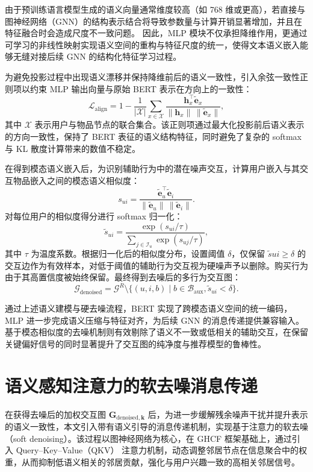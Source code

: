 由于预训练语言模型生成的语义向量通常维度较高（如 768 维或更高），若直接与图神经网络（GNN）的结构表示结合将导致参数量与计算开销显著增加，并且在特征融合时会造成尺度不一致问题。
因此，MLP 模块不仅承担降维作用，更通过可学习的非线性映射实现语义空间的重构与特征尺度的统一，使得文本语义嵌入能够无缝对接后续 GNN 的结构化特征学习过程。

为避免投影过程中出现语义漂移并保持降维前后的语义一致性，引入余弦一致性正则项以约束 MLP 输出向量与原始 BERT 表示在方向上的一致性：
\begin{equation} \mathcal{L}_{\text{align}} = 1 - \frac{1}{|\mathcal{X}|} \sum_{x \in \mathcal{X}} \frac{\mathbf{h}_x^\top \widetilde{\mathbf{e}}_x} {\|\mathbf{h}_x\| \, \|\widetilde{\mathbf{e}}_x\|}, \end{equation}
其中 $\mathcal{X}$ 表示用户与物品节点的联合集合。该正则项通过最大化投影前后语义表示的方向一致性，保持了 BERT 表征的语义结构特征，同时避免了复杂的 softmax 与 KL 散度计算带来的数值不稳定。

在得到模态语义嵌入后，为识别辅助行为中的潜在噪声交互，计算用户嵌入与其交互物品嵌入之间的模态语义相似度：
\begin{equation} s_{ui} = \frac{\widetilde{\mathbf{e}}_u^\top \widetilde{\mathbf{e}}_i} {\|\widetilde{\mathbf{e}}_u\| \, \|\widetilde{\mathbf{e}}_i\|}. \end{equation}
对每位用户的相似度得分进行 softmax 归一化：
\begin{equation} \tilde{s}_{ui} = \frac{\exp(s_{ui}/\tau)} {\sum_{j \in \mathcal{I}_u} \exp(s_{uj}/\tau)}, \end{equation}
其中 $\tau$ 为温度系数。根据归一化后的相似度分布，设置阈值 $\delta$，仅保留 $\tilde{s}{ui} \ge \delta$ 的交互边作为有效样本，对低于阈值的辅助行为交互视为硬噪声予以删除。购买行为由于其高置信度被始终保留。最终得到去噪后的多行为交互图：
\begin{equation} \mathcal{G}_{\text{denoised}} = \mathcal{G}^R \setminus \{(u,i,b) \mid b \in \mathcal{B}_{\text{aux}}, \tilde{s}_{ui} < \delta\}. \end{equation}

通过上述语义建模与硬去噪流程，BERT 实现了跨模态语义空间的统一编码，MLP 进一步完成语义压缩与特征对齐，为后续 GNN 的消息传递提供兼容输入。基于模态相似度的去噪机制则有效剔除了语义不一致或低相关的辅助交互，在保留关键偏好信号的同时显著提升了交互图的纯净度与推荐模型的鲁棒性。

\section{语义感知注意力的软去噪消息传递}  
在获得去噪后的加权交互图 $\boldsymbol{G_{\mathrm{denoised},k}}$ 后，为进一步缓解残余噪声干扰并提升表示的语义一致性，本文引入带有语义引导的消息传递机制，实现基于注意力的软去噪（soft denoising）。该过程以图神经网络为核心，在 GHCF \cite{chen2021GHCF} 框架基础上，通过引入 Query–Key–Value（QKV） 注意力机制，动态调整邻居节点在信息聚合中的权重，从而抑制低语义相关的邻居贡献，强化与用户兴趣一致的高相关邻居信号。

